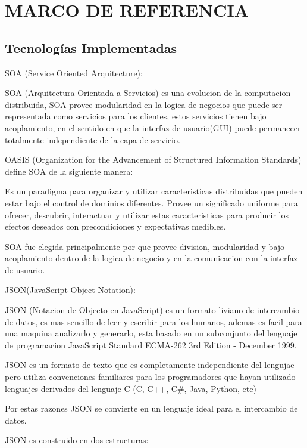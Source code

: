 \section{MARCO DE REFERENCIA}

\subsection{Tecnologías Implementadas}


SOA (Service Oriented Arquitecture):

SOA (Arquitectura Orientada a Servicios) es una evolucion de la computacion distribuida, SOA provee modularidad en la logica de negocios que puede ser representada como servicios para los clientes, estos servicios tienen bajo acoplamiento, en el sentido en que la interfaz de usuario(GUI) puede permanecer totalmente independiente de la capa de servicio.

OASIS (Organization for the Advancement of Structured Information Standards) define SOA de la siguiente manera:

Es un paradigma para organizar y utilizar caracteristicas distribuidas que pueden estar bajo el control de dominios diferentes. Provee un significado uniforme para ofrecer, descubrir, interactuar y utilizar estas caracteristicas para producir los efectos deseados con precondiciones y expectativas medibles.

SOA fue elegida principalmente por que provee division, modularidad y bajo acoplamiento dentro de la logica de negocio y en la comunicacion con la interfaz de usuario.



JSON(JavaScript Object Notation):

JSON (Notacion de Objecto en JavaScript) es un formato liviano de intercambio de datos, es mas sencillo de leer y escribir para los humanos, ademas es facil para una maquina analizarlo y generarlo, esta basado en un subconjunto del lenguaje de programacion JavaScript Standard ECMA-262 3rd Edition - December 1999.

JSON es un formato de texto que es completamente independiente del lengujae pero utiliza convenciones familiares para los programadores que hayan utilizado lenguajes derivados del lenguaje C (C, C++, C\#, Java, Python, etc)

Por estas razones JSON se convierte en un lenguaje ideal para el intercambio de datos.

JSON es construido en dos estructuras:

